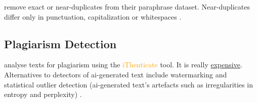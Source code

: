 \citet{gohsen_captions_2023} remove exact or near-duplicates from their paraphrase dataset.
Near-duplicates differ only in punctuation, capitalization or whitespaces \cite{gohsen_captions_2023}.

\subsection{Plagiarism Detection}
\citet{hassanipour_ability_2024} analyse texts for plagiarism using the \textcolor{orange}{iThenticate} tool.
It is really \href{https://www.ithenticate.com/pricing}{expensive}.
Alternatives to detectors of \ac{ai}-generated text include watermarking and statistical outlier detection 
(\ac{ai}-generated text's artefacts such as irregularities in entropy and perplexity) \cite{krishna_paraphrasing_2023}.